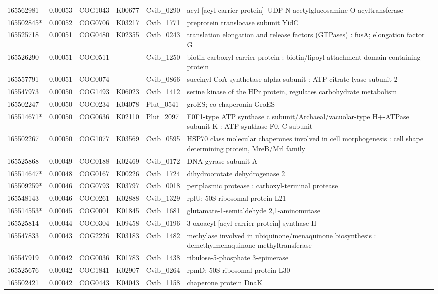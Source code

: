 \begin{landscape}
\begin{longtable}{p{1.8cm}p{0.9cm}p{2.2cm}p{1cm}p{2.8cm}p{13.4cm}}
165562981&0.00053&COG1043&K00677&Cvib\_0290&acyl-[acyl carrier protein]--UDP-N-acetylglucosamine O-acyltransferase \\
165502845*&0.00052&COG0706&K03217&Cvib\_1771&preprotein translocase subunit YidC \\
165525718&0.00051&COG0480&K02355&Cvib\_0243&translation elongation and release factors (GTPases) : fusA; elongation factor G \\
165526290&0.00051&COG0511&&Cvib\_1250&biotin carboxyl carrier protein : biotin/lipoyl attachment domain-containing protein \\
165557791&0.00051&COG0074&&Cvib\_0866&succinyl-CoA synthetase alpha subunit : ATP citrate lyase subunit 2 \\
165547973&0.00050&COG1493&K06023&Cvib\_1412&serine kinase of the HPr protein, regulates carbohydrate metabolism \\
165502247&0.00050&COG0234&K04078&Plut\_0541&groES; co-chaperonin GroES \\
165514671*&0.00050&COG0636&K02110&Plut\_2097&F0F1-type ATP synthase c subunit/Archaeal/vacuolar-type H$+$-ATPase subunit K : ATP synthase F0, C subunit \\
165502267&0.00050&COG1077&K03569&Cvib\_0595&HSP70 class molecular chaperones involved in cell morphogenesis : cell shape determining protein, MreB/Mrl family \\
165525868&0.00049&COG0188&K02469&Cvib\_0172&DNA gyrase subunit A \\
165514647*&0.00048&COG0167&K00226&Cvib\_1724&dihydroorotate dehydrogenase 2 \\
165509259*&0.00046&COG0793&K03797&Cvib\_0018&periplasmic protease : carboxyl-terminal protease \\
165548143&0.00046&COG0261&K02888&Cvib\_1329&rplU; 50S ribosomal protein L21 \\
165514553*&0.00045&COG0001&K01845&Cvib\_1681&glutamate-1-semialdehyde 2,1-aminomutase \\
165525814&0.00044&COG0304&K09458&Cvib\_0196&3-oxoacyl-[acyl-carrier-protein] synthase II \\
165547833&0.00043&COG2226&K03183&Cvib\_1482&methylase involved in ubiquinone/menaquinone biosynthesis : demethylmenaquinone methyltransferase \\
165547919&0.00042&COG0036&K01783&Cvib\_1438&ribulose-5-phosphate 3-epimerase \\
165525676&0.00042&COG1841&K02907&Cvib\_0264&rpmD; 50S ribosomal protein L30 \\
165502421&0.00042&COG0443&K04043&Cvib\_1158&chaperone protein DnaK \\

\end{longtable}
\end{landscape}
